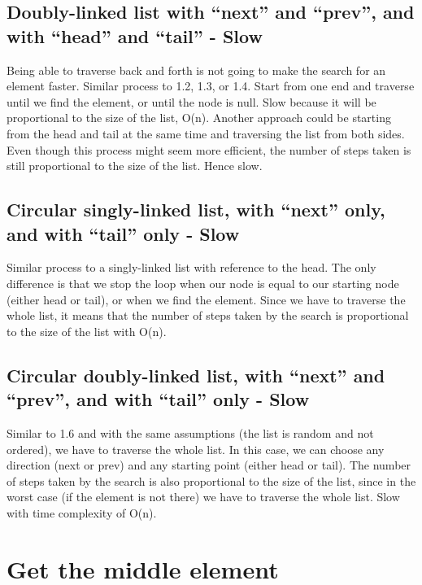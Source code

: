\documentclass{article}
\begin{document}
\subsection{Doubly-linked list with “next” and “prev”, and with “head” and “tail” - Slow}
Being able to traverse back and forth is not going to make the search for an element faster. Similar process to 1.2, 1.3, or 1.4. Start from one end and traverse until we find the element, or until the node is null. Slow because it will be proportional to the size of the list, O(n).
Another approach could be starting from the head and tail at the same time and traversing the list from both sides. Even though this process might seem more efficient, the number of steps taken is still proportional to the size of the list. Hence slow.

\subsection{Circular singly-linked list, with “next” only, and with “tail” only - Slow}
Similar process to a singly-linked list with reference to the head. The only difference is that we stop the loop when our node is equal to our starting node (either head or tail), or when we find the element. Since we have to traverse the whole list, it means that the number of steps taken by the search is proportional to the size of the list with O(n).

\subsection{Circular doubly-linked list, with “next” and “prev”, and with “tail” only - Slow}
Similar to 1.6 and with the same assumptions (the list is random and not ordered), we have to traverse the whole list. In this case, we can choose any direction (next or prev) and any starting point (either head or tail). The number of steps taken by the search is also proportional to the size of the list, since in the worst case (if the element is not there) we have to traverse the whole list. Slow with time complexity of O(n).



\section{Get the middle element}
\end{document}

